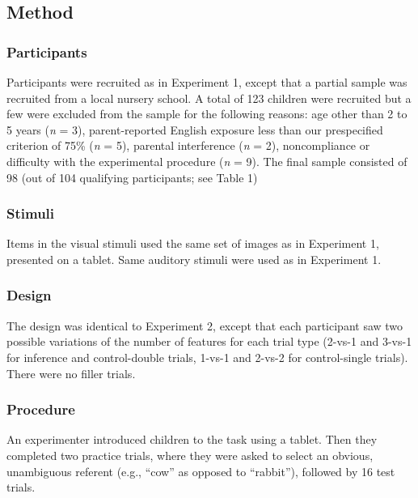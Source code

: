\documentclass[a4paper,man,apacite,floatsintext]{apa6}
\begin{document}
\subsection{Method}\label{method-2}

\subsubsection{Participants}\label{participants-2}

Participants were recruited as in Experiment 1, except that a partial
sample was recruited from a local nursery school. A total of 123
children were recruited but a few were excluded from the sample for the
following reasons: age other than 2 to 5 years (\emph{n} = 3),
parent-reported English exposure less than our prespecified criterion of
75\% (\emph{n} = 5), parental interference (\emph{n} = 2), noncompliance
or difficulty with the experimental procedure (\emph{n} = 9). The final
sample consisted of 98 (out of 104 qualifying participants; see Table 1)

\subsubsection{Stimuli}\label{stimuli-1}

Items in the visual stimuli used the same set of images as in Experiment
1, presented on a tablet. Same auditory stimuli were used as in
Experiment 1.

\subsubsection{Design}\label{design}

The design was identical to Experiment 2, except that each participant
saw two possible variations of the number of features for each trial
type (2-vs-1 and 3-vs-1 for inference and control-double trials, 1-vs-1
and 2-vs-2 for control-single trials). There were no filler trials.

\subsubsection{Procedure}\label{procedure-1}

An experimenter introduced children to the task using a tablet. Then
they completed two practice trials, where they were asked to select an
obvious, unambiguous referent (e.g., ``cow'' as opposed to ``rabbit''),
followed by 16 test trials.
\end{document}
